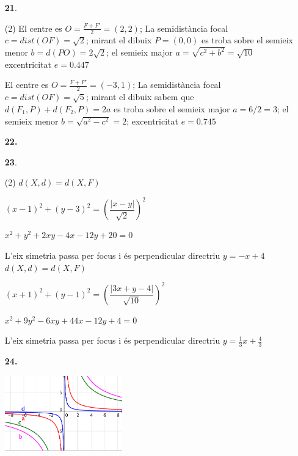 \documentclass[a4paper, pdf, twoside]{book}
\begin{document}
\begin{multicols}{2}
\begin{enumerate}
 \item[\fontfamily{phv}\selectfont\color{blue}\textbf{21}. ] 
 \begin{tasks}[column-sep=1em, item-indent=1.3333em](2)
	 \task* El centre es $O=\frac {F+F'}{2}=(2,2)$; La semidistància focal $c=dist(OF)=\sqrt {2}$; mirant el dibuix $P=(0,0)$ es troba sobre el semieix menor $b=d(PO)=2\sqrt {2}$; el semieix major $a=\sqrt {c^2+b^2}=\sqrt {10}$ excentricitat $e=0.447$ \par {}
	 \task* El centre es $O=\frac {F+F'}{2}=(-3,1)$; La semidistància focal $c=dist(OF)=\sqrt {5}$; mirant el dibuix sabem que $d(F_1,P)+d(F_2,P)=2a$ es troba sobre el semieix major $a=6/2=3$; el semieix menor $b=\sqrt {a^2-c^2}=2$; excentricitat $e=0.745$ \par {} 
\end{tasks}
\vspace{0.25cm}
\item[\fontfamily{phv}\selectfont\color{blue}\textbf{22. }] 
\mbox {}\par {}
\vspace{0.25cm}



 \item[\fontfamily{phv}\selectfont\color{blue}\textbf{23}. ] 
 \begin{tasks}[column-sep=1em, item-indent=1.3333em](2)
	 \task*  $d(X,d)=d(X,F)$\par $(x-1)^2+(y-3)^2=\left ( \dfrac {|x-y|}{\sqrt {2}} \right )^2$\par $x^2+y^2+2xy-4x-12y+20=0$\par L'eix simetria passa per focus i és perpendicular directriu $y=-x+4$
	 \task* $d(X,d)=d(X,F)$\par $(x+1)^2+(y-1)^2=\left ( \dfrac {|3x+y-4|}{\sqrt {10}} \right )^2$\par $x^2+9y^2-6xy+44x-12y+4=0$\par L'eix simetria passa per focus i és perpendicular directriu $y=\frac {1}{3}x+\frac {4}{3}$ \par {} 
\end{tasks}
\vspace{0.25cm}
\item[\fontfamily{phv}\selectfont\color{blue}\textbf{24. }] 
\mbox {}\par \includegraphics [width=0.4\textwidth ]{img-sol/t10-22}
\vspace{0.25cm}



\end{enumerate}
\end{multicols}
\end{document}
